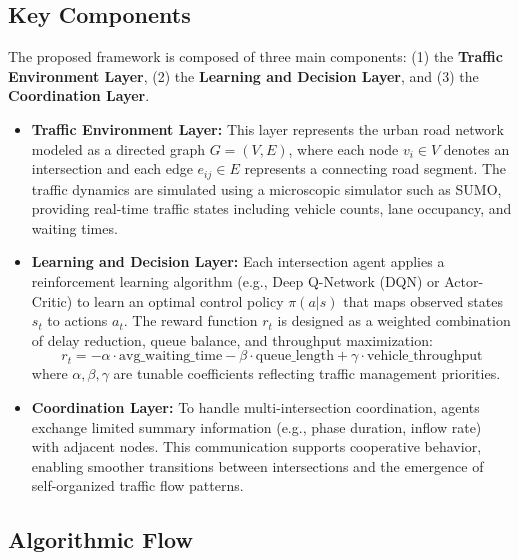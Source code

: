 \documentclass[12pt]{report} %
\begin{document}
\subsection{Key Components}

The proposed framework is composed of three main components: (1) the \textbf{Traffic Environment Layer}, (2) the \textbf{Learning and Decision Layer}, and (3) the \textbf{Coordination Layer}.

\begin{itemize}
    \item \textbf{Traffic Environment Layer:}  
    This layer represents the urban road network modeled as a directed graph $G = (V, E)$, where each node $v_i \in V$ denotes an intersection and each edge $e_{ij} \in E$ represents a connecting road segment. The traffic dynamics are simulated using a microscopic simulator such as SUMO, providing real-time traffic states including vehicle counts, lane occupancy, and waiting times.

    \item \textbf{Learning and Decision Layer:}  
    Each intersection agent applies a reinforcement learning algorithm (e.g., Deep Q-Network (DQN) or Actor-Critic) to learn an optimal control policy $\pi(a|s)$ that maps observed states $s_t$ to actions $a_t$. The reward function $r_t$ is designed as a weighted combination of delay reduction, queue balance, and throughput maximization:
    \[
    r_t = - \alpha \cdot \text{avg\_waiting\_time} - \beta \cdot \text{queue\_length} + \gamma \cdot \text{vehicle\_throughput}
    \]
    where $\alpha, \beta, \gamma$ are tunable coefficients reflecting traffic management priorities.

    \item \textbf{Coordination Layer:}  
    To handle multi-intersection coordination, agents exchange limited summary information (e.g., phase duration, inflow rate) with adjacent nodes. This communication supports cooperative behavior, enabling smoother transitions between intersections and the emergence of self-organized traffic flow patterns.
\end{itemize}

\subsection{Algorithmic Flow}
\end{document}
